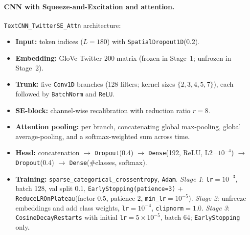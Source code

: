 \documentclass[10pt]{article}
\begin{document}
\paragraph{CNN with Squeeze-and-Excitation and attention.}
\texttt{TextCNN\_TwitterSE\_Attn} architecture:
\begin{itemize}
  \item \textbf{Input:} token indices ($L=180$) with \texttt{SpatialDropout1D}(0.2).
  \item \textbf{Embedding:} GloVe-Twitter-200 matrix (frozen in Stage~1; unfrozen in Stage~2).
  \item \textbf{Trunk:} five \texttt{Conv1D} branches (128 filters; kernel sizes $\{2,3,4,5,7\}$), each followed by \texttt{BatchNorm} and \texttt{ReLU}.
  \item \textbf{SE-block:} channel-wise recalibration with reduction ratio $r=8$.
  \item \textbf{Attention pooling:} per branch, concatenating global max-pooling, global average-pooling, and a softmax-weighted sum across time.
  \item \textbf{Head:} concatenation $\rightarrow$ \texttt{Dropout}(0.4) $\rightarrow$ \texttt{Dense}(192, ReLU, L2=$10^{-4}$) $\rightarrow$ \texttt{Dropout}(0.4) $\rightarrow$ \texttt{Dense}(\#classes, softmax).
  \item \textbf{Training:} \texttt{sparse\_categorical\_crossentropy}, \texttt{Adam}. \textit{Stage 1}: \texttt{lr}$=10^{-3}$, batch 128, val split 0.1, \texttt{EarlyStopping(patience=3)} + \texttt{ReduceLROnPlateau}(factor 0.5, patience 2, \texttt{min\_lr}$=10^{-5}$).
        \textit{Stage 2}: unfreeze embeddings and add class weights, \texttt{lr}$=10^{-4}$, \texttt{clipnorm}$=1.0$.
        \textit{Stage 3}: \texttt{CosineDecayRestarts} with initial \texttt{lr}$=5\!\times\!10^{-5}$, batch 64; \texttt{EarlyStopping} only.
\end{itemize}
\end{document}
